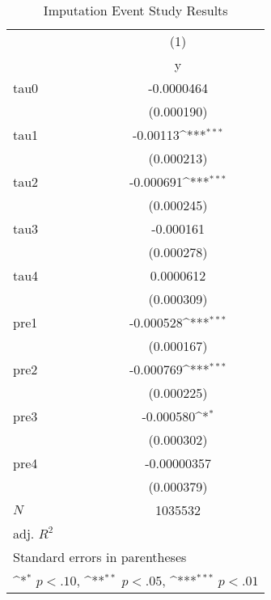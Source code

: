 \begin{table}[htbp]\centering
\def\sym#1{\ifmmode^{#1}\else\(^{#1}\)\fi}
\caption{Imputation Event Study Results}
\begin{tabular}{l*{1}{c}}
\hline\hline
            &\multicolumn{1}{c}{(1)}\\
            &\multicolumn{1}{c}{y}\\
\hline
tau0        &  -0.0000464         \\
            &  (0.000190)         \\
[1em]
tau1        &    -0.00113\sym{***}\\
            &  (0.000213)         \\
[1em]
tau2        &   -0.000691\sym{***}\\
            &  (0.000245)         \\
[1em]
tau3        &   -0.000161         \\
            &  (0.000278)         \\
[1em]
tau4        &   0.0000612         \\
            &  (0.000309)         \\
[1em]
pre1        &   -0.000528\sym{***}\\
            &  (0.000167)         \\
[1em]
pre2        &   -0.000769\sym{***}\\
            &  (0.000225)         \\
[1em]
pre3        &   -0.000580\sym{*}  \\
            &  (0.000302)         \\
[1em]
pre4        & -0.00000357         \\
            &  (0.000379)         \\
\hline
\(N\)       &     1035532         \\
adj. \(R^{2}\)&                     \\
\hline\hline
\multicolumn{2}{l}{\footnotesize Standard errors in parentheses}\\
\multicolumn{2}{l}{\footnotesize \sym{*} \(p<.10\), \sym{**} \(p<.05\), \sym{***} \(p<.01\)}\\
\end{tabular}
\end{table}
